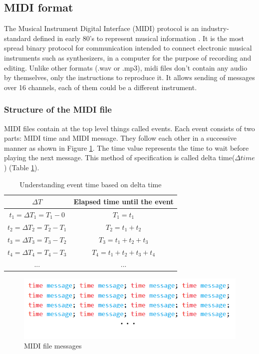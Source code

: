 \subsection{MIDI format}
The Musical Instrument Digital Interface (MIDI) protocol is an industry-standard defined in early 80's to represent musical information \cite{midi_history}. It is the most spread binary protocol for communication intended to connect electronic musical instruments such as synthesizers, in a computer for the purpose of recording and editing.\cite{midi_power} Unlike other formats (.wav or .mp3), midi files don't contain any audio by themselves, only the instructions to reproduce it. It allows sending of messages over 16 channels, each of them could be a different instrument.

\subsubsection{Structure of the MIDI file}
MIDI files contain at the top level things called events. Each event consists of two parts: MIDI time and MIDI message. They follow each other in a successive manner as shown in Figure \ref{fig:midi_messages}. The time value represents the time to wait before playing the next message. This method of specification is called delta time($\Delta time$) (Table \ref{table:midi_time}).

\begin{table} [H]
	\centering
	\caption{Understanding event time based on delta time}
	\begin{tabular}{ |c|c|} 
		\hline
		$\Delta T$ & Elapsed time until the event \\ \hline
		$t_1 = \Delta T_1 = T_1 - 0$ &  $T_1 = t_1$ \\ \hline
		$t_2 = \Delta T_2 = T_2 - T_1$ & $T_2 = t_1+t_2$\\ \hline
		$t_3 = \Delta T_3 = T_3 - T_2$ & $T_3 = t_1+t_2+t_3$ \\ \hline
		$t_4 = \Delta T_4 = T_4 - T_3$ & $T_4 = t_1+t_2+t_3+t_4$ \\ \hline
		... & ... \\ \hline						
	\end{tabular}
	\label{table:midi_time}
\end{table}

\begin{figure}[H]
	\caption[MIDI file messages]{ MIDI file messages }
	\centering
	\label{fig:midi_messages}
	\includegraphics[width=1\textwidth, height=0.9\textheight, keepaspectratio]{"resources/midi_messages"}
\end{figure}


